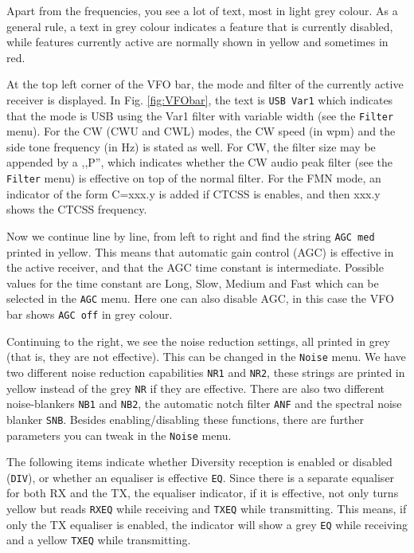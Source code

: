 \documentclass[12pt]{book}
\def\rett#1{\texttt{\color{red}#1}}
\def\bltt#1{\texttt{\color{blue}#1}}
\begin{document}
Apart from the frequencies, you see a lot  of text, most in
light grey colour. As a general rule, a text  in grey
colour indicates a feature that is currently disabled,
while features currently active are normally shown in
yellow and sometimes in red.

At the top left  corner of the VFO bar, the mode and
filter of the currently active receiver is displayed.
In Fig. \ref{fig:VFObar}, the text is \rett{USB Var1}
which indicates that the  mode
is USB using the Var1 filter with variable width (see the \bltt{Filter} menu).
For the CW (CWU and CWL) modes, the CW speed (in wpm) and the side tone
frequency (in Hz) is stated as well. For CW, the filter size may be appended
by a ,,P'', which indicates whether the CW audio peak filter (see the
\bltt{Filter} menu) is effective on top of the normal filter.
For the FMN mode, an indicator of the form C=xxx.y is added if
CTCSS is enables, and then xxx.y shows the CTCSS frequency.

Now we continue line by line, from left to right and find
the string \rett{AGC med} printed in yellow. This means
that automatic gain control (AGC)  is effective  in the
active receiver, and that the AGC time constant is
intermediate. Possible values for the time constant
are Long, Slow, Medium and Fast which can be selected
in the \bltt{AGC} menu. Here one can  also disable AGC,
in this case the VFO bar shows \rett{AGC off} in grey
colour.

Continuing to the right, we see the noise reduction settings,
all printed in grey (that is, they are not effective). This
can be changed in the \bltt{Noise} menu. We have two different
noise reduction capabilities \rett{NR1} and \rett{NR2}, these
strings are printed in yellow instead of the grey \rett{NR} if
they are effective. There are also two different noise-blankers
\rett{NB1} and \rett{NB2}, the automatic notch  filter
\rett{ANF} and the spectral  noise blanker \rett{SNB}.
Besides enabling/disabling these functions, there are  further parameters
you can tweak in the \bltt{Noise} menu.

The following items indicate whether Diversity reception is enabled or disabled
(\rett{DIV}), or whether an equaliser is effective \rett{EQ}.
Since there is a separate equaliser for both RX and the TX,
the equaliser indicator, if it is effective, not only turns yellow
but reads \rett{RXEQ} while receiving and \rett{TXEQ} while
transmitting. This means, if only the TX equaliser is enabled,
the indicator will show a  grey \rett{EQ} while receiving
and a yellow \rett{TXEQ}  while  transmitting.
\end{document}
